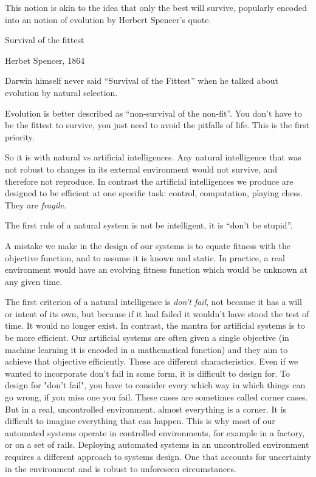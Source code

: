 \documentclass[a4paper]{caesar_book}
\begin{document}
This notion is akin to the idea that only the best will survive, popularly encoded into an notion of evolution by Herbert Spencer’s quote.

\begin{displayquote}
Survival of the fittest

Herbet Spencer, 1864
\end{displayquote}

Darwin himself never said ``Survival of the Fittest'' when he talked about evolution by natural selection.

Evolution is better described as ``non-survival of the non-fit''. You don’t have to be the fittest to survive, you just need to avoid the pitfalls of life. This is the first priority.

So it is with natural vs artificial intelligences. Any natural intelligence that was not robust to changes in its external environment would not survive, and therefore not reproduce. In contrast the artificial intelligences we produce are designed to be efficient at one specific task: control, computation, playing chess. They are \textit{fragile}.

The first rule of a natural system is not be intelligent, it is ``don’t be stupid''.

A mistake we make in the design of our systems is to equate fitness with the objective function, and to assume it is known and static. In practice, a real environment would have an evolving fitness function which would be unknown at any given time.

The first criterion of a natural intelligence is \textit{don’t fail}, not because it has a will or intent of its own, but because if it had failed it wouldn’t have stood the test of time. It would no longer exist. In contrast, the mantra for artificial systems is to be more efficient. Our artificial systems are often given a single objective (in machine learning it is encoded in a mathematical function) and they aim to achieve that objective efficiently. These are different characteristics. Even if we wanted to incorporate don’t fail in some form, it is difficult to design for. To design for "don’t fail", you have to consider every which way in which things can go wrong, if you miss one you fail. These cases are sometimes called corner cases. But in a real, uncontrolled environment, almost everything is a corner. It is difficult to imagine everything that can happen. This is why most of our automated systems operate in controlled environments, for example in a factory, or on a set of rails. Deploying automated systems in an uncontrolled environment requires a different approach to systems design. One that accounts for uncertainty in the environment and is robust to unforeseen circumstances.
\end{document}
